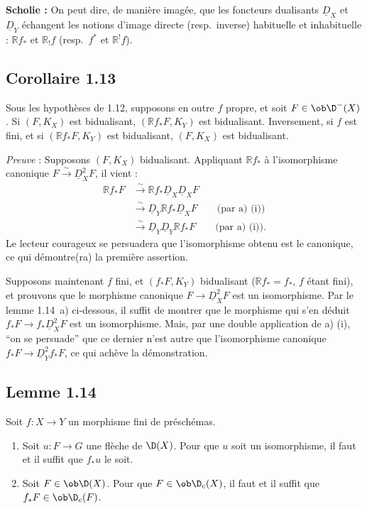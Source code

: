 \textbf{Scholie :} On peut dire, de manière imagée, que les foncteurs dualisants 
$\underline{D}_X$ et $\underline{D}_Y$
échangent les notions d'image directe (resp.~inverse) habituelle et inhabituelle : $\mathbb{R} f_{*}$ et $\mathbb{R}_{!}f$ (resp.~$f^{*}$ et $\mathbb{R}^{!}f$).

\subsection*{Corollaire 1.13}
Sous les hypothèses de 1.12, supposons en outre $f$ propre, et soit $F \in \ob \D^{-}(X)$. Si $(F, K_X)$ est bidualisant, $(\mathbb{R} f_{*}F, K_Y)$ est bidualisant. Inversement, si $f$ est fini, et si $(\mathbb{R} f_{*}F, K_Y)$ est bidualisant, $(F, K_X)$ est bidualisant.

\emph{Preuve} : Supposons $(F, K_X)$ bidualisant. Appliquant $\mathbb{R} f_{*}$ à l'isomorphisme canonique $F \xrightarrow{\sim} \underline{D}_X^{2} F$, il vient :
\begin{align*}
\mathbb{R} f_{*} F &\xrightarrow{\sim} \mathbb{R} f_{*} \underline{D}_X \underline{D}_X F \\
&\xrightarrow{\sim} \underline{D}_Y \mathbb{R} f_{*} \underline{D}_X F \qquad \text{(par a) (i))} \\
&\xrightarrow{\sim} \underline{D}_Y \underline{D}_Y \mathbb{R} f_{*} F \qquad \text{(par a) (i)).}
\end{align*}
Le lecteur courageux se persuadera que l'isomorphisme obtenu est le canonique, ce qui démontre(ra) la première assertion.

Supposons maintenant $f$ fini, et $(f_{*}F, K_Y)$ bidualisant ($\mathbb{R} f_{*} = f_{*}$, $f$ étant fini), et prouvons que le morphisme canonique $F \to \underline{D}_X^{2} F$ est un isomorphisme. Par le lemme 1.14~a) ci-dessous, il suffit de montrer que le morphisme qui s'en déduit $f_{*}F \to f_{*}\underline{D}_X^{2} F$ est un isomorphisme. Mais, par une double application de a) (i), ``on se persuade'' que ce dernier n'est autre que l'isomorphisme canonique $f_{*}F \to \underline{D}_Y^{2} f_{*}F$, ce qui achève la démonstration.

\subsection*{Lemme 1.14}
Soit $f : X \to Y$ un morphisme fini de préschémas.
\begin{enumerate}
\item[a)] Soit $u : F \to G$ une flèche de $\D(X)$. Pour que $u$ soit un isomorphisme, il faut et il suffit que $f_{*}u$ le soit.
\item[b)]
Soit $F \in \ob \D(X)$. Pour que $F \in \ob \D_c(X)$, il faut et il suffit que $f_{*}F \in \ob \D_c(F)$.
\end{enumerate}

